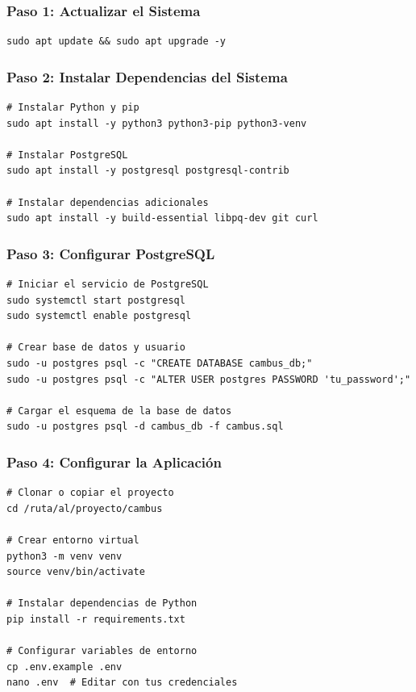 \documentclass[12pt,a4paper]{article}
\begin{document}
\subsubsection{Paso 1: Actualizar el Sistema}

\begin{lstlisting}[style=bash]
sudo apt update && sudo apt upgrade -y
\end{lstlisting}

\subsubsection{Paso 2: Instalar Dependencias del Sistema}

\begin{lstlisting}[style=bash]
# Instalar Python y pip
sudo apt install -y python3 python3-pip python3-venv

# Instalar PostgreSQL
sudo apt install -y postgresql postgresql-contrib

# Instalar dependencias adicionales
sudo apt install -y build-essential libpq-dev git curl
\end{lstlisting}

\subsubsection{Paso 3: Configurar PostgreSQL}

\begin{lstlisting}[style=bash]
# Iniciar el servicio de PostgreSQL
sudo systemctl start postgresql
sudo systemctl enable postgresql

# Crear base de datos y usuario
sudo -u postgres psql -c "CREATE DATABASE cambus_db;"
sudo -u postgres psql -c "ALTER USER postgres PASSWORD 'tu_password';"

# Cargar el esquema de la base de datos
sudo -u postgres psql -d cambus_db -f cambus.sql
\end{lstlisting}

\subsubsection{Paso 4: Configurar la Aplicación}

\begin{lstlisting}[style=bash]
# Clonar o copiar el proyecto
cd /ruta/al/proyecto/cambus

# Crear entorno virtual
python3 -m venv venv
source venv/bin/activate

# Instalar dependencias de Python
pip install -r requirements.txt

# Configurar variables de entorno
cp .env.example .env
nano .env  # Editar con tus credenciales
\end{lstlisting}
\end{document}
